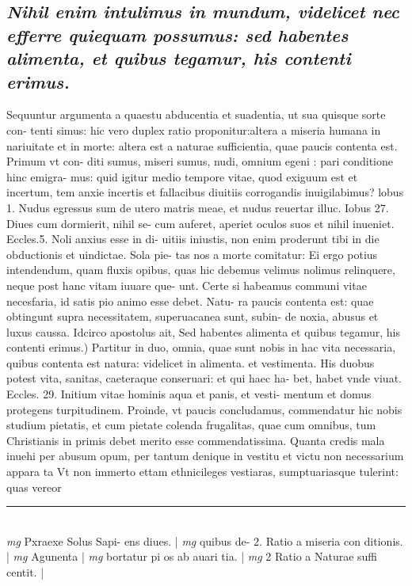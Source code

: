 \documentclass{article}
\begin{document}
\begin{pages}
\subsection*{\textit{Nihil enim intulimus in mundum, videlicet nec efferre quiequam possumus: sed habentes alimenta, et quibus tegamur, his contenti erimus. }}\pstart Sequuntur argumenta a quaestu abducentia et suadentia, ut sua quisque sorte con- tenti simus: hic vero duplex ratio proponitur:altera a miseria humana in nariuitate et in morte: altera est a naturae sufficientia, quae paucis contenta est. Primum vt con- diti sumus, miseri sumus, nudi, omnium egeni : pari conditione hinc emigra- mus: quid igitur medio tempore vitae, quod exiguum est et incertum, tem anxie incertis et fallacibus diuitiis corrogandis inuigilabimus? lobus 1. Nudus egressus sum de utero matris meae, et nudus reuertar illuc. Iobus 27. Diues cum dormierit, nihil se- cum auferet, aperiet oculos suos et nihil inueniet. Eccles.5. Noli anxius esse in di- uitiis iniustis, non enim proderunt tibi in die obductionis et uindictae. Sola pie- tas nos a morte comitatur: Ei ergo potius intendendum, quam fluxis opibus, quas hic debemus velimus nolimus relinquere, neque post hanc vitam iuuare que- unt. Certe si habeamus communi vitae necesfaria, id satis pio animo esse debet. Natu- ra paucis contenta est: quae obtingunt supra necessitatem, superuacanea sunt, subin- de noxia, abusus et luxus caussa. Idcirco apostolus ait,  \pend\pstart Sed habentes alimenta et quibus tegamur, his contenti erimus.) Partitur in duo, omnia, quae sunt nobis in hac vita necessaria, quibus contenta est natura: videlicet in alimenta. et vestimenta. His duobus potest vita, sanitas, caeteraque conseruari: et qui haec ha- bet, habet vnde viuat. Eccles. 29. Initium vitae hominis aqua et panis, et vesti- mentum et domus protegens turpitudinem. Proinde, vt paucis concludamus, commendatur hic nobis studium pietatis, et cum pietate colenda frugalitas, quae cum omnibus, tum Christianis in primis debet merito esse commendatissima. Quanta credis mala inuehi per abusum opum, per tantum denique in vestitu et victu non necessarium appara ta Vt non immerto ettam ethnicileges vestiaras, sumptuariasque tulerint: quas vereor  \pend
\vspace{0.5cm}\noindent
\vspace{0.2cm}\rule{1cm}{0.2pt}\\ 
\hspace{0.2cm}\textit{mg}
\footnotesize Pxraexe Solus Sapi- ens diues. 
\normalsize| 
\hspace{0.2cm}\textit{mg}
\footnotesize quibus de- 2. Ratio a miseria con ditionis. 
\normalsize| 
\hspace{0.2cm}\textit{mg}
\footnotesize Agunenta 
\normalsize| 
\hspace{0.2cm}\textit{mg}
\footnotesize bortatur pi os ab auari tia. 
\normalsize| 
\hspace{0.2cm}\textit{mg}
\footnotesize 2 Ratio a Naturae suffi centit. 
\normalsize| 

\end{pages}
\end{document}
